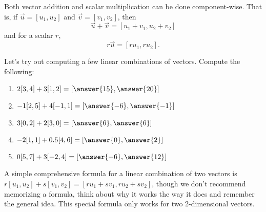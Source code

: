 \documentclass{ximera}
\begin{document}
\begin{remark}
    Both vector addition and scalar multiplication can be done component-wise. That is, if $\vec{u}=[u_1,u_2]$ and $\vec{v}=[v_1,v_2]$, then
    \[\vec{u}+\vec{v}=[u_1+v_1,u_2+v_2]\]
    and for a scalar $r$,
    \[r\vec{u}=[ru_1,ru_2].\]
\end{remark}

\begin{problem}
    Let's try out computing a few linear combinations of vectors. Compute the following:
    \begin{enumerate}
        \item $2[3,4]+3[1,2]=[\answer{15},\answer{20}]$
        \item $-1[2,5]+4[-1,1]=[\answer{-6},\answer{-1}]$
        \item $3[0,2]+2[3,0]=[\answer{6},\answer{6}]$
        \item $-2[1,1]+0.5[4,6]=[\answer{0},\answer{2}]$
        \item $0[5,7]+3[-2,4]=[\answer{-6},\answer{12}]$
    \end{enumerate}

    \begin{feedback}
        A simple comprehensive formula for a linear combination of two vectors is $r[u_1,u_2]+s[v_1,v_2]=[ru_1+sv_1,ru_2+sv_2]$, though we don't recommend memorizing a formula, think about why it works the way it does and remember the general idea. This special formula only works for two 2-dimensional vectors.
    \end{feedback}
\end{problem}
\end{document}
